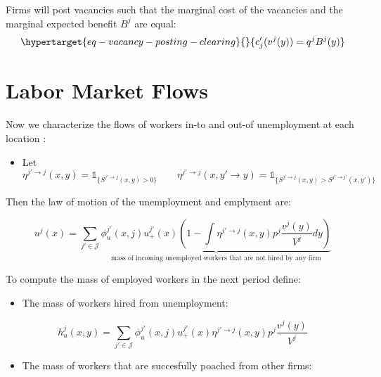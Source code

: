 \documentclass[
  letterpaper,
  DIV=11,
  numbers=noendperiod]{scrreprt}
\providecommand{\tightlist}{%
  \setlength{\itemsep}{0pt}\setlength{\parskip}{0pt}}\usepackage{longtable,booktabs,array}
\begin{document}
Firms will post vacancies such that the marginal cost of the vacancies
and the marginal expected benefit \(B^j\) are equal:
\begin{equation}\protect\hypertarget{eq-vacancy-posting-clearing}{}{c_{j}'(v^{j}(y))=q^{j}B^{j}(y)}\label{eq-vacancy-posting-clearing}\end{equation}

\hypertarget{labor-market-flows}{%
\section{Labor Market Flows}\label{labor-market-flows}}

Now we characterize the flows of workers in-to and out-of unemployment
at each location :

\begin{itemize}
\tightlist
\item
  Let
  \[\eta^{j' \to j}(x,y) = \mathbb{1}_{\{S^{j' \to j}(x,y)>0\}} \qquad \eta^{j' \to j}(x,y'\to y) = \mathbb{1}_{\{S^{j' \to j}(x,y) > S^{j' \to j'}(x,y')\}}\]
\end{itemize}

Then the law of motion of the unemployment and emplyment are:

\begin{equation}
\label{eq-law-of-motion-unemp}
u^{j}(x) = \sum_{j'\in \mathcal{J}}\underbrace{\phi_u^{j'}(x,j) u_{+}^{j'}(x)\left( 1 - \int \eta^{j'\to j}(x,y) p^j\frac{v^j(y)}{V^j}dy \right)}_{\text{mass of incoming unemployed workers that are not hired by any firm}}
\end{equation}

To compute the mass of employed workers in the next period define:

\begin{itemize}
\tightlist
\item
  The mass of workers hired from unemployment:
\end{itemize}

\begin{equation}
h^j_{u}(x,y) = \sum_{j'\in \mathcal{J}}\phi_u^{j'}(x,j) u_{+}^{j'}(x)\eta^{j'\to j}(x,y) p^j\frac{v^j(y)}{V^j}
\end{equation}

\begin{itemize}
\tightlist
\item
  The mass of workers that are succesfully poached from other firms:
\end{itemize}
\end{document}
